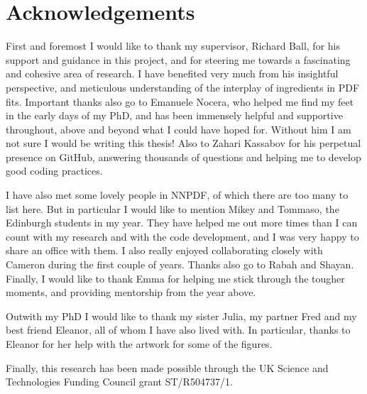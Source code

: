 \chapter{Acknowledgements}

\noindent

\normalsize

First and foremost I would like to thank my supervisor, Richard Ball, for his support and guidance in this project, and for steering me towards a fascinating and cohesive area of research. I have benefited very much from his insightful perspective, and meticulous understanding of the interplay of ingredients in PDF fits. Important thanks also go to Emanuele Nocera, who helped me find my feet in the early days of my PhD, and has been immensely helpful and supportive throughout, above and beyond what I could have hoped for. Without him I am not sure I would be writing this thesis! Also to Zahari Kassabov for his perpetual presence on GitHub, answering thousands of questions and helping me to develop good coding practices. 

I have also met some lovely people in NNPDF, of which there are too many to list here. But in particular I would like to mention Mikey and Tommaso, the Edinburgh students in my year. They have helped me out more times than I can count with my research and with the code development, and I was very happy to share an office with them. I also really enjoyed collaborating closely with Cameron during the first couple of years. Thanks also go to Rabah and Shayan. Finally, I would like to thank Emma for helping me stick through the tougher moments, and providing mentorship from the year above. 

Outwith my PhD I would like to thank my sister Julia, my partner Fred and my best friend Eleanor, all of whom I have also lived with. In particular, thanks to Eleanor for her help with the artwork for some of the figures. 

Finally, this research has been made possible through the UK Science and Technologies Funding Council grant ST/R504737/1.

